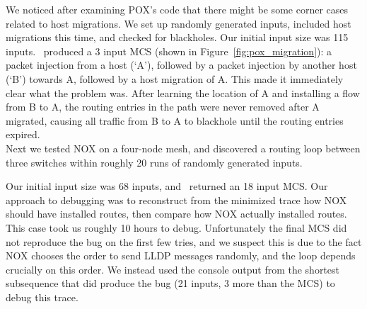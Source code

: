  We noticed after examining POX's code
that there might be some corner cases related to host migrations.
We set up randomly generated inputs, included host
migrations this time, and checked for blackholes. Our initial input size was
115 inputs.
\projectname~produced a 3 input MCS (shown
in Figure~\ref{fig:pox_migration}): a packet injection from a
host (`A'), followed
by a packet injection by another host (`B') towards A, followed by a host migration of A. This made it immediately
clear what the problem was. After learning the location of A and installing a
flow from B to A, the routing entries in the path were never removed after A
migrated, causing all traffic from B to A to blackhole until the routing
entries expired.\\[0.5ex]
 Next we tested NOX on a four-node mesh, and discovered a
routing loop between three switches within
roughly 20 runs of randomly generated inputs.


Our initial input size was 68 inputs, and
\projectname~returned an 18 input MCS.
Our approach to debugging was to
reconstruct from the minimized trace how NOX should have installed routes, then compare
how NOX actually installed routes. This case took us roughly 10 hours to debug. Unfortunately the final MCS did
not reproduce the bug on the first few tries, and we suspect this is due to the fact
NOX chooses the order to send LLDP messages randomly, and the loop depends
crucially on this order. We instead used the console output from the shortest
subsequence that did produce the bug (21 inputs, 3 more than the MCS) to debug this trace.

